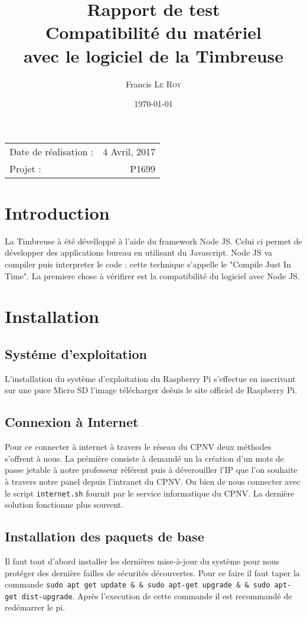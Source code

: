 \documentclass[10pt,a4paper,onecolumn]{article}
\title{Rapport de test \\ Compatibilité du matériel \\ avec le logiciel de la Timbreuse}
\author{Francis \textsc{Le Roy}}
\date{\today}
\begin{document}
\maketitle
\thispagestyle{fancy}

\begin{center}
\begin{tabular}{l r}
Date de réalisation : & 4 Avril, 2017 \\
Projet : & P1699 \\
\end{tabular}
\end{center}


\section{Introduction}
La Timbreuse à été dévelloppé à l'aide du framework Node JS. Celui ci permet de développer des applications bureau en utilisant du Javascript.
Node JS va compiler puis interpreter le code : cette technique s'appelle le "Compile Just In Time". La premiere chose à vérifirer est la
compatibilité du logiciel avec Node JS.
\section{Installation}
\subsection{Systéme d'exploitation}
L'installation du système d'exploitation du Raspberry Pi s'effectue en inscrivant sur une puce Micro SD l'image télécharger deèuis le site officiel
de Raspberry Pi.
\subsection{Connexion à Internet}
Pour ce connecter à internet à travers le réseau du CPNV deux méthodes s'offrent à nous. La prémière consiste à demandé un la création d'un mots de passe
jetable à notre professeur référent puis à déverouiller l'IP que l'on souhaite à travers notre panel depuis l'intranet du CPNV. Ou bien de nous connecter
avec le script \texttt{internet.sh} fournit par le service informatique du CPNV. La dernière solution fonctionne plus souvent.

\subsection{Installation des paquets de base}
Il faut tout d'abord installer les dernières mise-à-jour du système pour nous protéger des dernière failles de sécurités découvertes.
Pour ce faire il faut taper la commande \texttt{sudo apt\- get update \& \&  sudo apt-get upgrade \& \&  sudo apt-get dist-upgrade}. Après l'execution de cette commande
il est recommandé de redémarrer le pi.
\end{document}

